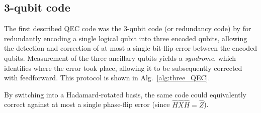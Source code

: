 \subsection{3-qubit code}

The first described QEC code was the 3-qubit code (or redundancy code) by \cite{bib:Shor95} for redundantly encoding a single logical qubit into three encoded qubits, allowing the detection and correction of at most a single bit-flip error between the encoded qubits. Measurement of the three ancillary qubits yields a \textit{syndrome}, which identifies where the error took place, allowing it to be subsequently corrected with feedforward. This protocol is shown in Alg.~\ref{alg:three_QEC}.

By switching into a Hadamard-rotated basis, the same code could equivalently correct against at most a single phase-flip error (since \mbox{$\hat{H}\hat{X}\hat{H}=\hat{Z}$}).

